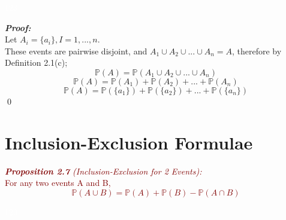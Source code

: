 \documentclass{report}
\newenvironment{cframedp}[1][Black]
  {\begin{tcolorbox}[colframe=#1,colback=white]}
  {\end{tcolorbox}}
\newenvironment{cframedprop}[1][Maroon]
  {\begin{tcolorbox}[colframe=#1,colback=white]}
  {\end{tcolorbox}}
\begin{document}
\textcolor{White}{123}

\begin{cframedp}
\textit{\textbf{Proof:}}\\
Let $A_i = \{a_i \}, I = 1,...,n.$\\
These events are pairwise disjoint, and $A_1 \cup A_2 \cup ... \cup A_n = A$, therefore by Definition 2.1(c);\\
\begin{equation}
    \mathbb{P}(A) = \mathbb{P}(A_1 \cup A_2 \cup ... \cup A_n)
\end{equation}
\begin{equation}
    \mathbb{P}(A) = \mathbb{P}(A_1) + \mathbb{P}(A_2) + ... + \mathbb{P}(A_n)
\end{equation}
\begin{equation}
    \mathbb{P}(A) = \mathbb{P}( \{a_1 \} ) + \mathbb{P}( \{a_2 \} ) + ... + \mathbb{P}( \{a_n \} )
\end{equation}
\qed
\end{cframedp}

\section{Inclusion-Exclusion Formulae}

\begin{cframedprop}
\textcolor{Maroon}{\textit{\textbf{Proposition 2.7} (Inclusion-Exclusion for 2 Events):}}\\
\textcolor{Maroon}{For any two events A and B,
\begin{equation}\mathbb{P}(A \cup B) = \mathbb{P}(A) + \mathbb{P}(B) - \mathbb{P}(A \cap B)
\end{equation}}
\end{cframedprop}

\textcolor{White}{123}
\end{document}
